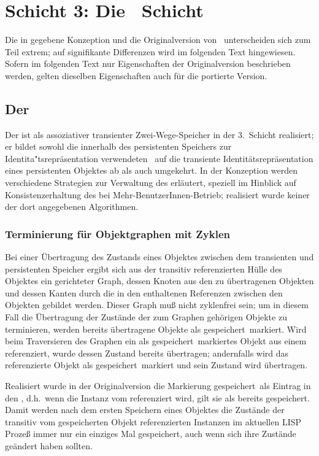 \section{Schicht 3: Die \protect\soh\ Schicht}
%
Die in \cite{bib:ro87} gegebene Konzeption und die Originalversion von
\soh\ unterscheiden sich zum Teil extrem; auf signifikante
Differenzen wird im folgenden Text hingewiesen. Sofern im folgenden
Text nur Eigenschaften der Originalversion beschrieben werden, gelten
dieselben Eigenschaften auch f\"{u}r die portierte Version.
%
\subsection{Der \protect\cache}
%
Der \cache\/ ist als assoziativer transienter Zwei-Wege-Speicher in der
3.~Schicht realisiert; er bildet sowohl die innerhalb des persistenten
Speichers zur Identita"tsrepr\"{a}sentation verwendeten \objid[s]\ auf
die transiente Identit\"{a}tsrepr\"{a}sentation eines persistenten Objektes
ab als auch umgekehrt. In der Konzeption
\cite[]{bib:ro87} werden
verschiedene Strategien zur Verwaltung des \cache\/ erl\"{a}utert,
speziell im Hinblick auf Konsistenzerhaltung des \cache\/ bei
Mehr-BenutzerInnen-Betrieb; realisiert wurde keiner der dort
angegebenen Algorithmen.
%
\subsubsection{Terminierung f\"{u}r Objektgraphen mit Zyklen}%
\label{sec:sohtcyc}%
%
Bei einer \"{U}bertragung des Zustands eines Objektes zwischen dem
transienten und persistenten Speicher ergibt sich aus der transitiv
referenzierten H\"{u}lle des Objektes ein gerichteter Graph, dessen
Knoten aus den zu \"{u}bertragenen Objekten und dessen Kanten durch die
in den \Slt[s]\/ enthaltenen Referenzen zwischen den Objekten gebildet
werden. Dieser Graph mu\ss{} nicht zyklenfrei sein; um in diesem Fall die
\"{U}bertragung der Zust\"{a}nde der zum Graphen geh\"{o}rigen Objekte zu
terminieren, werden bereits \"{u}bertragene Objekte als
\rglq{}gespeichert\rgrq\ markiert. Wird beim Traversieren des Graphen
ein als \rglq{}gespeichert\rgrq\ markiertes Objekt aus einem
\Slt\/ referenziert, wurde dessen Zustand bereits \"{u}bertragen;
andernfalls wird das referenzierte Objekt als
\rglq{}gespeichert\rgrq\ markiert und sein Zustand wird \"{u}bertragen.
%
\par{}Realisiert wurde in der Originalversion die Markierung
\rglq{}gespeichert\rgrq\ als
Eintrag in den \cache, d.h.\ wenn die Instanz vom \cache\/ referenziert
wird, gilt sie als bereits gespeichert. Damit werden nach dem ersten
Speichern eines Objektes die Zust\"{a}nde der transitiv vom gespeicherten
Objekt referenzierten Instanzen im aktuellen LISP Proze\ss{} immer nur
ein einziges Mal gespeichert, auch wenn sich ihre Zust\"{a}nde ge\"{a}ndert
haben sollten.
%
